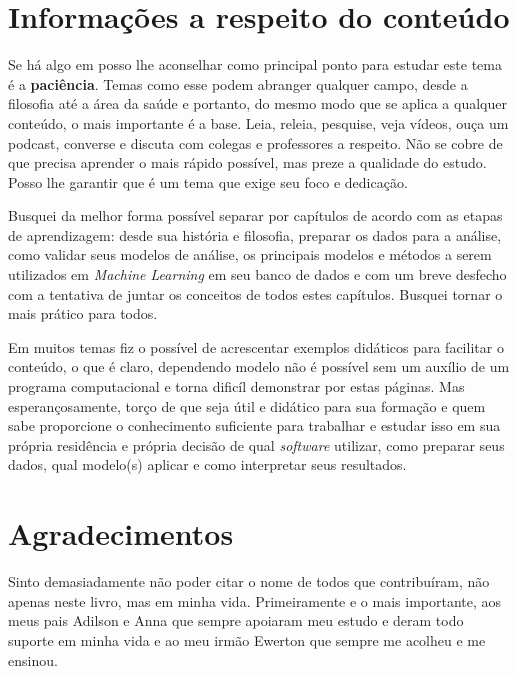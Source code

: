 \documentclass[
  openany]{book}
\begin{document}
\hypertarget{informauxe7uxf5es-a-respeito-do-conteuxfado}{%
\section{Informações a respeito do conteúdo}\label{informauxe7uxf5es-a-respeito-do-conteuxfado}}

Se há algo em posso lhe aconselhar como principal ponto para estudar este tema é a \textbf{paciência}. Temas como esse podem abranger qualquer campo, desde a filosofia até a área da saúde e portanto, do mesmo modo que se aplica a qualquer conteúdo, o mais importante é a base. Leia, releia, pesquise, veja vídeos, ouça um podcast, converse e discuta com colegas e professores a respeito. Não se cobre de que precisa aprender o mais rápido possível, mas preze a qualidade do estudo. Posso lhe garantir que é um tema que exige seu foco e dedicação.

Busquei da melhor forma possível separar por capítulos de acordo com as etapas de aprendizagem: desde sua história e filosofia, preparar os dados para a análise, como validar seus modelos de análise, os principais modelos e métodos a serem utilizados em \emph{Machine Learning} em seu banco de dados e com um breve desfecho com a tentativa de juntar os conceitos de todos estes capítulos. Busquei tornar o mais prático para todos.

Em muitos temas fiz o possível de acrescentar exemplos didáticos para facilitar o conteúdo, o que é claro, dependendo modelo não é possível sem um auxílio de um programa computacional e torna dificíl demonstrar por estas páginas. Mas esperançosamente, torço de que seja útil e didático para sua formação e quem sabe proporcione o conhecimento suficiente para trabalhar e estudar isso em sua própria residência e própria decisão de qual \emph{software} utilizar, como preparar seus dados, qual modelo(s) aplicar e como interpretar seus resultados.

\hypertarget{agradecimentos}{%
\section{Agradecimentos}\label{agradecimentos}}

Sinto demasiadamente não poder citar o nome de todos que contribuíram, não apenas neste livro, mas em minha vida. Primeiramente e o mais importante, aos meus pais Adilson e Anna que sempre apoiaram meu estudo e deram todo suporte em minha vida e ao meu irmão Ewerton que sempre me acolheu e me ensinou.
\end{document}
